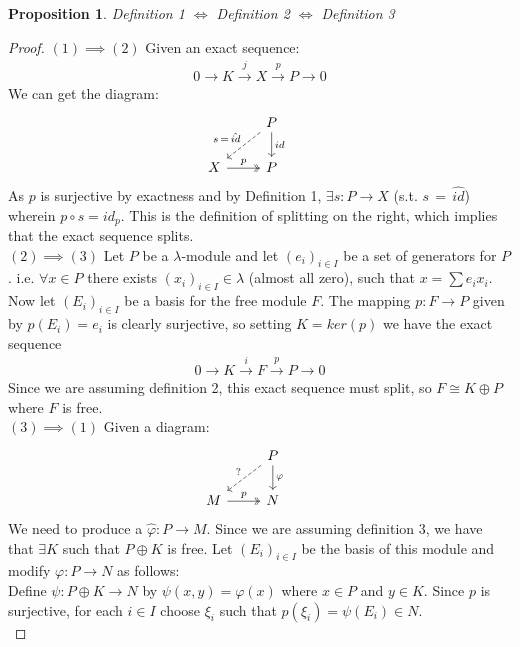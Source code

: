 \documentclass[12pt]{book}
\newtheorem{proposition}[theorem]{Proposition}
\theoremstyle{definition}
\begin{document}
\begin{proposition}
    Definition 1 $\iff$ Definition 2 $\iff$ Definition 3
\end{proposition}
\begin{proof}
    $(1) \implies (2)$
    Given an exact sequence: 
    \begin{align*}
        0 \rightarrow K \xrightarrow{j} X \xrightarrow{p} P \rightarrow 0
    \end{align*}
    We can get the diagram: 
    \[
    \begin{tikzcd}
    & P \arrow[ld, dashed, "s \, =\,  \hat{id}"'] \arrow[d, "id"] & \\
    X \arrow[r, two heads, "p"] & P &
    \end{tikzcd}
    \]
    As $p$ is surjective by exactness and by Definition 1, $\exists s : P \rightarrow X$ (s.t. $s \, = \, \hat{id}$) wherein $p \circ s = id_p$. This is the definition of splitting on the right, which implies that the exact sequence splits.\\
    $(2) \implies (3)$ Let $P$ be a $\lambda$-module and let $(e_i)_{i \in I}$ be a set of generators for $P$. i.e. $\forall x \in P$ there exists $(x_i)_{i \in I} \in \lambda$ (almost all zero), such that $x = \sum e_i x_i$. Now let $(E_i)_{i \in I}$ be a basis for the free module $F$. The mapping $p : F \to P$ given by $p(E_i) = e_i$ is clearly surjective, so setting $K = ker(p)$ we have the exact sequence
    \begin{align*}
        0 \rightarrow K \xrightarrow{i} F \xrightarrow{p} P \rightarrow 0
    \end{align*} 
    Since we are assuming definition 2, this exact sequence must split, so $F \cong K \oplus P$ where $F$ is free. \\
    $(3) \implies (1)$ Given a diagram: 
    \[
    \begin{tikzcd}
    & P \arrow[ld, dashed, "?"'] \arrow[d, "\varphi"] & \\
    M \arrow[r, two heads, "p"] & N &
    \end{tikzcd}
    \]
    We need to produce a $\hat{\varphi} : P \to M$. Since we are assuming definition 3, we have that $\exists K$ such that $ P \oplus K$ is free. Let $(E_i)_{i \in I}$ be the basis of this module and modify $\varphi : P \to N$ as follows: \\
    Define $\psi : P \oplus K \to N$ by $\psi(x,y) = \varphi(x)$ where $x \in P$ and $y \in K$. Since $p$ is surjective, for each $i \in I$ choose $\xi_i$ such that $p(\xi_i) = \psi(E_i) \in N$.\\

\end{proof}
\end{document}
